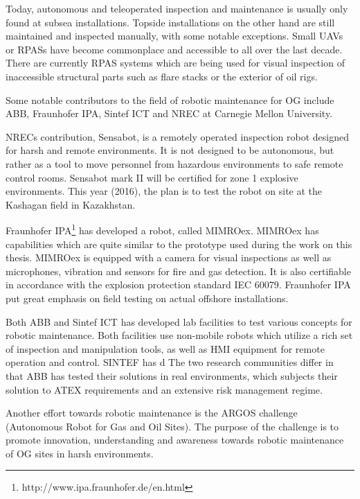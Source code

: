 Today, autonomous and teleoperated inspection and maintenance is usually only found at subsea installations. Topside installations on the other hand are still maintained and inspected manually, with some notable exceptions. Small \acp{UAV} or \acp{RPAS} have become commonplace and accessible to all over the last decade. There are currently \ac{RPAS} systems which are being used for visual inspection of inaccessible structural parts such as flare stacks or the exterior of oil rigs.

Some notable contributors to the field of robotic maintenance for \ac{OG} include ABB, \ac{Fraunhofer IPA}, Sintef ICT\cite{sintef_robot_consept} and NREC  at  Carnegie
Mellon University. 

NRECs contribution, Sensabot, is a remotely operated inspection robot designed for harsh and remote environments\cite{deploymentsensabot}. It is not designed to be autonomous, but rather as a tool to move personnel from hazardous environments to safe remote control rooms. Sensabot mark II will be certified for zone 1 explosive environments. This year (2016), the plan is to test the robot on site at the Kashagan field in Kazakhstan\cite{peerless2016robot}.

\ac{Fraunhofer IPA}\footnote{http://www.ipa.fraunhofer.de/en.html} has developed a robot, called \ac{MIMROex}. \ac{MIMROex} has capabilities which are quite similar to the prototype used during the work on this thesis. \ac{MIMROex} is equipped with a camera for visual inspections as well as microphones, vibration and sensors for fire and gas detection. It is also certifiable in accordance with the explosion protection standard IEC 60079\cite{MIMROex}. \ac{Fraunhofer IPA} put great emphasis on field testing on actual offshore installations.

Both ABB and Sintef ICT has developed lab facilities to test various concepts for robotic maintenance. Both facilities use non-mobile robots which utilize a rich set of inspection and manipulation tools, as well as \ac{HMI} equipment for remote operation and control. SINTEF has d The two research communities differ in that ABB has tested their solutions in real environments, which subjects their solution to ATEX requirements and an extensive risk management regime\cite{StepwiseApproachToRobotics}. 

Another effort towards robotic maintenance is the ARGOS challenge (Autonomous Robot for Gas and Oil Sites). The purpose of the challenge is to promote innovation, understanding and awareness towards robotic maintenance of \ac{OG} sites in harsh environments\cite{ARGOS}.